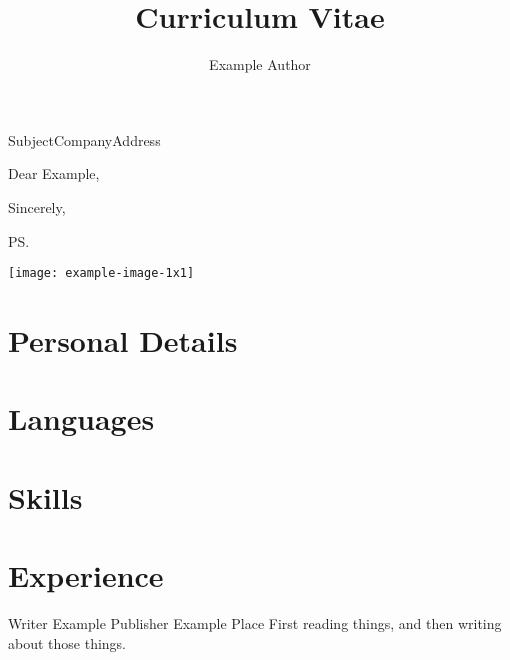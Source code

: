 \documentclass[
  xcolor=dvipsnames,
  primary=Fuchsia,
  biblatex,
  signcv,
  14pt,a4paper
]{polycv}
\title{Curriculum Vitae}
\author{Example Author}
\begin{document}
\begin{polycvletter}[\polycvaddress\\\polycvmobile\\\polycvemail]{Subject}{Company\newline Address}
  \opening{Dear Example,}

  \blindtext[1-3]

  \closing{Sincerely,}
  \ps{\blindtext[1]}
\end{polycvletter}
\begin{polycvfirstpage}
  \nocite{*}%
  \begin{polycvsidebar}
  
  \texttt{[image: example-image-1x1]}\\[2ex]
  
  \section{Personal Details}
  \polycvlineaddress
  \polycvlineemail
  \polycvlinephone
  \polycvlinemobile
  \polycvlineorcid
  \polycvlinegithub
  \null
  
  \section{Languages}
  
  \section{Skills}
  
  \end{polycvsidebar}%
  \section{Experience}
  {Writer}
  {Example Publisher}
  {Example Place}
  {}
  {First reading things, and then writing about those things.}
  

\end{polycvfirstpage}
\end{document}
